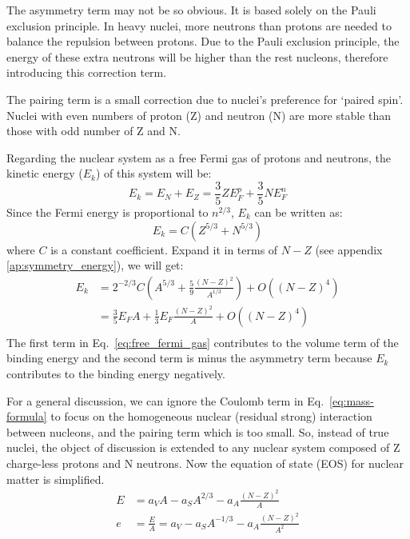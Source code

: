 The asymmetry term may not be so obvious. It is based solely on the Pauli exclusion principle. %
In heavy nuclei,
more neutrons than protons are needed to balance the repulsion between protons.
Due to the Pauli exclusion principle, the energy of these extra neutrons will be 
higher than the rest nucleons, therefore introducing this correction term.

The pairing term is a small correction due to nuclei's preference for `paired spin'. %
Nuclei with even numbers of proton (Z) and neutron (N) are more stable than those with odd number
of Z and N.

Regarding the nuclear system as a free Fermi gas of protons and neutrons, the 
kinetic energy ($E_k$) of this system will be:
\begin{equation}
    E_k = E_N + E_Z = \frac{3}{5}ZE_F^p + \frac{3}{5}NE_F^n
\end{equation}
Since the Fermi energy is proportional to $n^{2/3}$, $E_k$ can be written as:
\begin{equation}
    E_k = C(Z^{5/3} + N^{5/3})
\end{equation}
where $C$ is a constant coefficient. 
Expand it in terms of $N-Z$ (see appendix \ref{ap:symmetry_energy}), we will get:
\begin{equation}
    \begin{aligned}
	E_k &= 2^{-2/3}C\left(A^{5/3} + \frac{5}{9}\frac{(N-Z)^2}{A^{1/3}} \right) + O((N-Z)^4) \\
	    &= \frac{3}{5} E_F A + \frac{1}{3}E_F\frac{(N-Z)^2}{A} + O((N-Z)^4) \\
    \end{aligned}
    \label{eq:free_fermi_gas}
\end{equation}
The first term in Eq.~\ref{eq:free_fermi_gas} contributes to the volume term 
of the binding energy and the second term is minus the 
asymmetry term because $E_k$ contributes to the binding energy negatively.

For a general discussion, we can ignore the Coulomb term in Eq.~\ref{eq:mass-formula}
to focus on the homogeneous nuclear (residual strong) interaction between nucleons, 
and the pairing term which is too small.
So, instead of true nuclei, the object of discussion is extended to any nuclear 
system composed of Z charge-less protons and N neutrons. Now the equation
of state (EOS) for nuclear matter is simplified.
\begin{equation}
    \begin{aligned}
	E &= a_V A - a_S A^{2/3} - a_A\frac{(N-Z)^2}{A}  \\
	e &= \frac{E}{A} = a_V - a_S A^{-1/3} - a_A\frac{(N-Z)^2}{A^2}
    \end{aligned}
    \label{eq:modified-mass-formula-1}
\end{equation}

